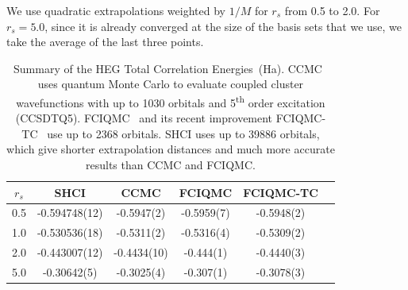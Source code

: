 \documentclass[%
reprint,
 superscriptaddress,
 amsmath,amssymb,
 aps,
]{revtex4-1}
\newcommand\nth{\textsuperscript{th}\xspace} %
\begin{document}
We use quadratic extrapolations weighted by $1/M$ for $r_s$ from 0.5 to 2.0.
For $r_s=5.0$, since it is already converged at the size of the basis sets that we use, we take the average of the last three points.
\begin{table}
\caption{Summary of the HEG Total Correlation Energies~(Ha).
CCMC~\cite{neufeld2017study} uses quantum Monte Carlo to evaluate coupled cluster wavefunctions with up to 1030 orbitals and 5\nth order excitation (CCSDTQ5).
FCIQMC~\cite{shepherd2012full} and its recent improvement FCIQMC-TC~\cite{luo2018combining} use up to 2368 orbitals.
SHCI uses up to 39886 orbitals, which give shorter extrapolation distances and much more accurate results than CCMC and FCIQMC.
}
\label{tab:results}
\begin{tabular}{| c || c || c | c | c | c |}
 \hline
 $r_s$ & SHCI & CCMC & FCIQMC & FCIQMC-TC \\
 \hline\hline
 0.5 & -0.594748(12) & -0.5947(2) & -0.5959(7) & -0.5948(2)\\
 \hline
 1.0 & -0.530536(18) & -0.5311(2) & -0.5316(4) & -0.5309(2)\\
 \hline
 2.0 & -0.443007(12) & -0.4434(10) & -0.444(1) & -0.4440(3)\\
 \hline
 5.0 & -0.30642(5) & -0.3025(4) & -0.307(1) & -0.3078(3)\\
 \hline
\end{tabular}
\end{table}
\end{document}
